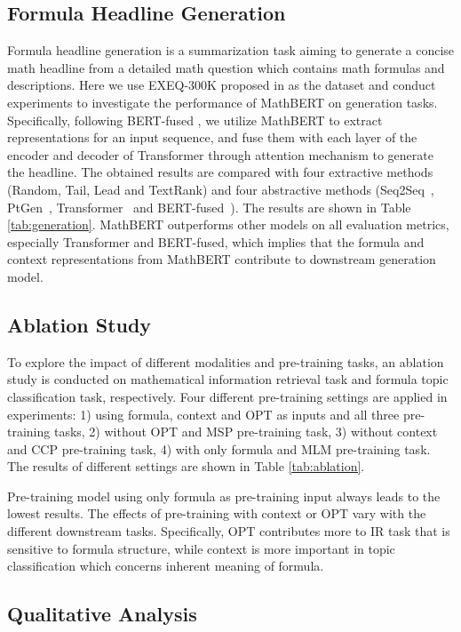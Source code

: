 \documentclass{article}
\begin{document}
\subsection{Formula Headline Generation}

Formula headline generation is a summarization task aiming to generate a concise math headline from a detailed math question which contains math formulas and descriptions. Here we use EXEQ-300K proposed in \cite{yuanke} as the dataset and conduct experiments to investigate the performance of MathBERT on generation tasks. Specifically, following BERT-fused \cite{BERT-fused}, we utilize MathBERT to extract representations for an input sequence, and fuse them with each layer of the encoder and decoder of Transformer through attention mechanism to generate the headline. The obtained results are compared with four extractive methods (Random, Tail, Lead and TextRank) and four abstractive methods (Seq2Seq~\cite{LSTM}, PtGen~\cite{PtGen}, Transformer~\cite{Transformer} and BERT-fused~\cite{BERT-fused}). The results are shown in Table \ref{tab:generation}. MathBERT outperforms other models on all evaluation metrics, especially Transformer and BERT-fused, which implies that the formula and context representations from MathBERT contribute to downstream generation model.

\subsection{Ablation Study}

To explore the impact of different modalities and pre-training tasks, an ablation study is conducted on mathematical information retrieval task and formula topic classification task, respectively. Four different pre-training settings are applied in experiments: 1) using formula, context and OPT as inputs and all three pre-training tasks, 2) without OPT and MSP pre-training task, 3) without context and CCP pre-training task, 4) with only formula and MLM pre-training task. The results of different settings are shown in Table \ref{tab:ablation}.

Pre-training model using only formula as pre-training input always leads to the lowest results. The effects of pre-training with context or OPT vary with the different downstream tasks. Specifically, OPT contributes more to IR task that is sensitive to formula structure, while context is more important in topic classification which concerns inherent meaning of formula. 

\subsection{Qualitative Analysis}
\end{document}
